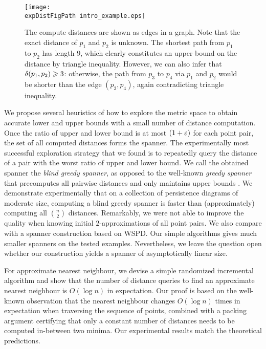 \begin{figure}[h]
\centering
\texttt{[image: \\expDistFigPath  intro\_example.eps]}
\caption{The compute distances are shown as edges in a graph. Note that the exact distance
of $p_1$ and $p_2$ is unknown. The shortest path from $p_1$ to $p_2$ has length $9$, which clearly
constitutes an upper bound on the distance by triangle inequality.
However, we can also infer that $\delta(p_1,p_2)\geqslant 3$:
otherwise, the path from $p_3$ to $p_4$ via $p_1$ and $p_2$
would be shorter than the edge $(p_3,p_4)$, again contradicting
triangle inequality.}
\label{fig:1st_example}
\end{figure}

We propose several heuristics of how to explore the metric space to obtain accurate lower and upper bounds
with a small number of distance computation. Once the ratio of upper and lower bound is at most $(1+\varepsilon)$
for each point pair, the set of all computed distances forms the spanner.
The experimentally most successful exploration strategy that we found is to
repeatedly query the distance of a pair with the worst ratio of upper and lower bound.
We call the obtained spanner the \emph{blind greedy spanner}, as opposed to the well-known
\emph{greedy spanner} that precomputes all pairwise distances and only maintains upper bounds \cite{althofer1993sparse}.
We demonstrate experimentally that on a collection
of persistence diagrams of moderate size, computing a blind greedy spanner is faster than (approximately)
computing all $\binom{n}{2}$ distances.
Remarkably, we were not able to improve the quality when knowing initial $2$-approximations of all point pairs.
We also compare with a spanner construction based on WSPD. Our simple algorithms gives much smaller
spanners on the tested examples. 
Nevertheless, we leave the question open whether our construction
yields a spanner of asymptotically linear size. 

For approximate nearest neighbour, we devise a simple randomized incremental algorithm and show that
the number of distance queries to find an approximate nearest neighbour is $O(\log n)$ in expectation.
Our proof is based on the well-known observation that the nearest neighbour changes $O(\log n)$ times
in expectation when traversing the sequence of points, combined with a packing argument certifying that
only a constant number of distances needs to be computed in-between two minima.
Our experimental results match the theoretical predictions.

